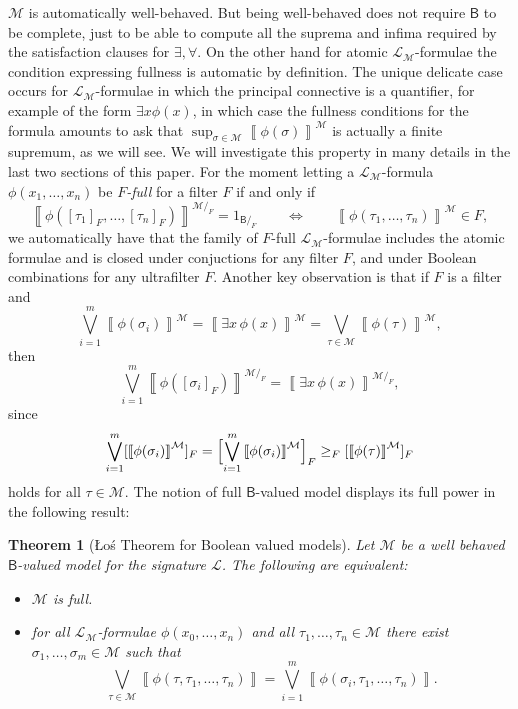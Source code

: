 \documentclass[11pt]{amsart}
\newcommand{\LL}{\mathcal{L}}
\theoremstyle{plain}
\newtheorem{theorem}{Theorem}[section]
\theoremstyle{definition}
\theoremstyle{plain}
\theoremstyle{remark}
\newcommand{\M}{\mathcal{M}}
\newcommand{\bool}[1]{\mathsf{#1}}
\newcommand{\Qp}[1]{\left\llbracket #1 \right\rrbracket}
\newcommand{\0}{\mathsf{0}}
\renewcommand{\1}{\mathsf{1}}
\renewcommand{\2}{\mathsf{2}}
\theoremstyle{definition}
\begin{document}
$\M$ is automatically well-behaved. But being well-behaved does not require $\bool{B}$ to be complete, just to be able to compute all the suprema and infima required by the satisfaction clauses for $\exists,\forall$.
On the other hand for atomic $\LL_\M$-formulae the condition expressing fullness is automatic by definition. 
The unique delicate case occurs for $\LL_\M$-formulae  in 
which the principal connective is a quantifier, for example of the form $\exists x\phi(x)$, in which case
the fullness conditions for the formula amounts to ask that $\sup_{\sigma\in\M}\Qp{\phi(\sigma)}^\M$ is actually a finite supremum, as we will see. We will investigate this property in many details in the last two sections of this paper. For the moment letting a 
$\LL_\M$-formula $\phi(x_1,\dots,x_n)$ be \emph{$F$-full} for a filter $F$ if and only if 
\[
\Qp{\phi([\tau_1]_F,\dots,[\tau_n]_F)}^{\M/_F}=1_{\bool{B}/_F}\qquad\Longleftrightarrow\qquad\Qp{\phi(\tau_1,\dots,\tau_n)}^\M\in F,
\]
we automatically have that the family of $F$-full $\LL_\M$-formulae includes the atomic formulae and is closed under conjuctions for any filter $F$, and under Boolean 
combinations for any ultrafilter $F$. 
Another key observation is that if $F$ is a filter and
\[
\bigvee_{i=1}^m\Qp{\phi(\sigma_i)}^{\M}=\Qp{\exists x\,\phi(x)}^{\M}=\bigvee_{\tau\in \M}\Qp{\phi(\tau)}^{\M},
\]
then
\[
\bigvee_{i=1}^m\Qp{\phi([\sigma_i]_F)}^{\M/_F}=\Qp{\exists x\,\phi(x)}^{\M/_F},
\]
since 
\[
\bigvee_{i=1}^m[\Qp{\phi(\sigma_i)}^\M]_F=\Bigl[\bigvee_{i=1}^m\Qp{\phi(\sigma_i)}^{\M}\Bigr]_F\geq_F [\Qp{\phi(\tau)}^{\M}]_F
\]
holds for all $\tau\in\M$.%
The notion of full $\bool{B}$-valued model displays its full power in the following result:
\begin{theorem}[\L o\'s Theorem for Boolean valued models] \label{thm:charLosThm}
Let $\M$ be a well behaved $\bool{B}$-valued model for the signature $\LL$.
The following are equivalent:
\begin{itemize}
\item $\M$ is full.
\item for all $\LL_\M$-formulae $\phi(x_0,\dots,x_n)$
and all $\tau_1,\dots,\tau_n\in\M$ there exist $\sigma_1, \dots, \sigma_m\in\M$ such that
\[
\bigvee_{\tau\in \M}\Qp{\phi(\tau,\tau_1,\dots,\tau_n)}=\bigvee_{i=1}^m\Qp{\phi(\sigma_i,\tau_1,\dots,\tau_n)}.
\]
\end{itemize}
\end{theorem}
\end{document}
